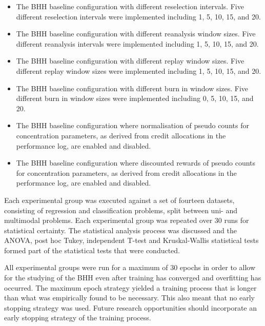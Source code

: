 \begin{itemize}
\begin{itemize}
                  \item The \acs{BHH} baseline configuration with different reselection intervals. Five different reselection intervals were implemented including 1, 5, 10, 15, and 20.

                  \item The \acs{BHH} baseline configuration with different reanalysis window sizes. Five different reanalysis intervals were implemented including 1, 5, 10, 15, and 20.

                  \item The \acs{BHH} baseline configuration with different replay window sizes. Five different replay window sizes were implemented including 1, 5, 10, 15, and 20.

                  \item The \acs{BHH} baseline configuration with different burn in window sizes. Five different burn in window sizes were implemented including 0, 5, 10, 15, and 20.

                  \item The \acs{BHH} baseline configuration where normalisation of pseudo counts for concentration parameters, as derived from credit allocations in the performance log, are enabled and disabled.

                  \item The \acs{BHH} baseline configuration where discounted rewards of pseudo counts for concentration parameters, as derived from credit allocations in the performance log, are enabled and disabled.
            \end{itemize}
\end{itemize}

Each experimental group was executed against a set of fourteen datasets, consisting of regression and classification problems, split between uni- and multimodal problems. Each experimental group was repeated over 30 runs for statistical certainty. The statistical analysis process was discussed and the ANOVA, post hoc Tukey, independent T-test and Kruskal-Wallis statistical tests formed part of the statistical tests that were conducted.

All experimental groups were run for a maximum of 30 epochs in order to allow for the studying of the \ac{BHH} even after training has converged and overfitting has occurred. The maximum epoch strategy yielded a training process that is longer than what was empirically found to be necessary. This also meant that no early stopping strategy was used. Future research opportunities should incorporate an early stopping strategy of the training process.

